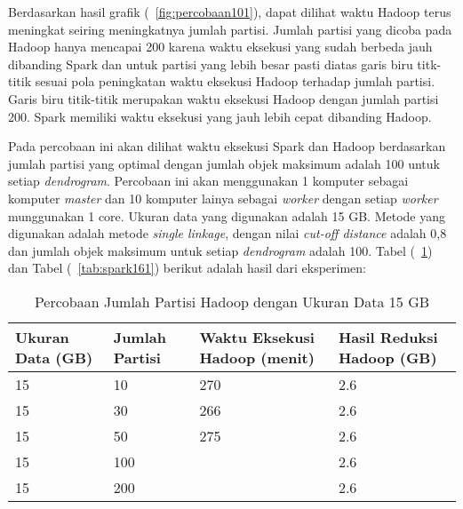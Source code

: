 Berdasarkan hasil grafik (~\ref{fig:percobaan101}), dapat dilihat waktu Hadoop terus meningkat seiring meningkatnya jumlah partisi. Jumlah partisi yang dicoba pada Hadoop hanya mencapai 200 karena waktu eksekusi yang sudah berbeda jauh dibanding Spark dan untuk partisi yang lebih besar pasti diatas garis biru titk-titik sesuai pola peningkatan waktu eksekusi Hadoop terhadap jumlah partisi. Garis biru titik-titik merupakan waktu eksekusi Hadoop dengan jumlah partisi 200. Spark memiliki waktu eksekusi yang jauh lebih cepat dibanding Hadoop.  





Pada percobaan ini akan dilihat waktu eksekusi Spark dan Hadoop berdasarkan jumlah partisi yang optimal dengan jumlah objek maksimum adalah 100 untuk setiap \textit{dendrogram}. Percobaan ini akan menggunakan 1 komputer sebagai komputer \textit{master} dan 10 komputer lainya sebagai \textit{worker} dengan setiap \textit{worker} munggunakan 1 core. Ukuran data yang digunakan adalah 15 GB. Metode yang digunakan adalah metode \textit{single linkage}, dengan nilai \textit{cut-off distance} adalah 0,8 dan jumlah objek maksimum untuk setiap \textit{dendrogram} adalah 100. Tabel (~\ref{tab:spark151}) dan Tabel (~\ref{tab:spark161}) berikut adalah hasil dari eksperimen:





\begin{table}[H] 
	\centering 
	\caption{Percobaan Jumlah Partisi Hadoop dengan Ukuran Data 15 GB}
	\label{tab:spark151}
	\begin{tabular}{|p{3cm}|p{3cm}|p{4cm}|p{4cm}|}
\hline
Ukuran Data (GB) & Jumlah Partisi &  Waktu Eksekusi Hadoop (menit) & Hasil Reduksi Hadoop (GB)\\
\hline
15 & 10 & 270  & 2.6  \\
\hline
15 & 30 & 266  & 2.6  \\
\hline
15 & 50 & 275  & 2.6  \\
\hline
15 & 100 &   & 2.6  \\
\hline
15 & 200 &   & 2.6  \\
\hline


\hline

	\end{tabular} 
\end{table}




